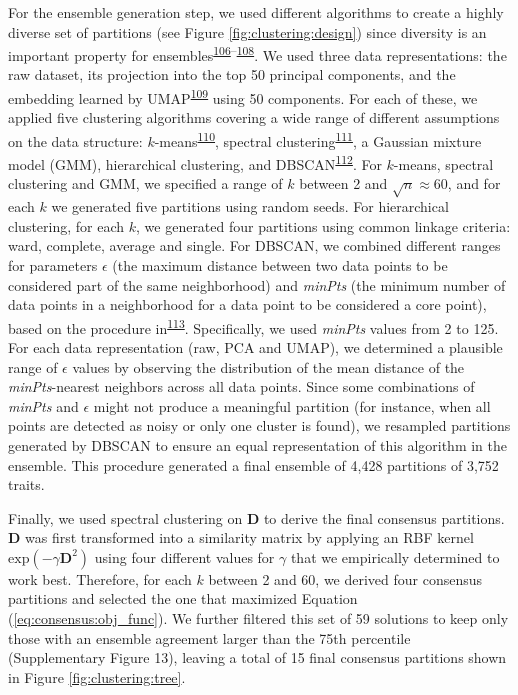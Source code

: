 \documentclass[
  a4paper,
]{article}
\begin{document}
For the ensemble generation step, we used different algorithms to create a highly diverse set of partitions (see Figure \ref{fig:clustering:design}) since diversity is an important property for ensembles\textsuperscript{\protect\hyperlink{ref-8js8Q3pF}{106}--\protect\hyperlink{ref-t5p3UpxZ}{108}}.
We used three data representations: the raw dataset, its projection into the top 50 principal components, and the embedding learned by UMAP\textsuperscript{\protect\hyperlink{ref-157h5hA34}{109}} using 50 components.
For each of these, we applied five clustering algorithms covering a wide range of different assumptions on the data structure: \(k\)-means\textsuperscript{\protect\hyperlink{ref-MxGpAiPu}{110}}, spectral clustering\textsuperscript{\protect\hyperlink{ref-x3CT24TB}{111}}, a Gaussian mixture model (GMM), hierarchical clustering, and DBSCAN\textsuperscript{\protect\hyperlink{ref-JrL3iQea}{112}}.
For \(k\)-means, spectral clustering and GMM, we specified a range of \(k\) between 2 and \(\sqrt{n} \approx 60\), and for each \(k\) we generated five partitions using random seeds.
For hierarchical clustering, for each \(k\), we generated four partitions using common linkage criteria: ward, complete, average and single.
For DBSCAN, we combined different ranges for parameters \(\epsilon\) (the maximum distance between two data points to be considered part of the same neighborhood) and \emph{minPts} (the minimum number of data points in a neighborhood for a data point to be considered a core point), based on the procedure in\textsuperscript{\protect\hyperlink{ref-FB7XPWl6}{113}}.
Specifically, we used \emph{minPts} values from 2 to 125.
For each data representation (raw, PCA and UMAP), we determined a plausible range of \(\epsilon\) values by observing the distribution of the mean distance of the \emph{minPts}-nearest neighbors across all data points.
Since some combinations of \emph{minPts} and \(\epsilon\) might not produce a meaningful partition (for instance, when all points are detected as noisy or only one cluster is found), we resampled partitions generated by DBSCAN to ensure an equal representation of this algorithm in the ensemble.
This procedure generated a final ensemble of 4,428 partitions of 3,752 traits.

Finally, we used spectral clustering on \(\mathbf{D}\) to derive the final consensus partitions.
\(\mathbf{D}\) was first transformed into a similarity matrix by applying an RBF kernel \(\mathrm{exp}(-\gamma \mathbf{D}^2)\) using four different values for \(\gamma\) that we empirically determined to work best.
Therefore, for each \(k\) between 2 and 60, we derived four consensus partitions and selected the one that maximized Equation (\ref{eq:consensus:obj_func}).
We further filtered this set of 59 solutions to keep only those with an ensemble agreement larger than the 75th percentile (Supplementary Figure 13), leaving a total of 15 final consensus partitions shown in Figure \ref{fig:clustering:tree}.
\end{document}

